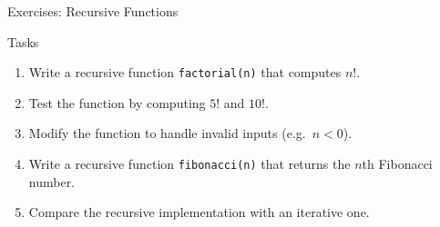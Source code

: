 \begin{frame}{Exercises: Recursive Functions}
	\begin{block}{Tasks}
		\begin{enumerate}
			\item Write a recursive function \texttt{factorial(n)} that computes $n!$.
			\item Test the function by computing $5!$ and $10!$.
			\item Modify the function to handle invalid inputs (e.g.\ $n < 0$).
			\item Write a recursive function \texttt{fibonacci(n)} that returns the $n$th Fibonacci number.
			\item Compare the recursive implementation with an iterative one.
		\end{enumerate}
	\end{block}
\end{frame}



